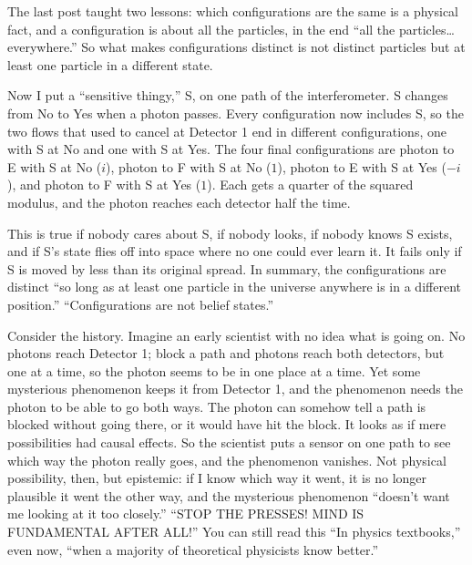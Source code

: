 
The last post taught two lessons: which configurations are the same is a physical fact, and a configuration is about all the particles, in the end ``all the particles… everywhere.'' So what makes configurations distinct is not distinct particles but at least one particle in a different state. 

Now I put a ``sensitive thingy,'' S, on one path of the interferometer. S changes from No to Yes when a photon passes. Every configuration now includes S, so the two flows that used to cancel at Detector 1 end in different configurations, one with S at No and one with S at Yes. The four final configurations are photon to E with S at No ($i$), photon to F with S at No ($1$), photon to E with S at Yes ($-i$), and photon to F with S at Yes ($1$). Each gets a quarter of the squared modulus, and the photon reaches each detector half the time. 

This is true if nobody cares about S, if nobody looks, if nobody knows S exists, and if S's state flies off into space where no one could ever learn it. It fails only if S is moved by less than its original spread.  In summary, the configurations are distinct ``so long as at least one particle in the universe anywhere is in a different position.''  ``Configurations are not belief states.'' 

Consider the history. Imagine an early scientist with no idea what is going on. No photons reach Detector 1; block a path and photons reach both detectors, but one at a time, so the photon seems to be in one place at a time. Yet some mysterious phenomenon keeps it from Detector 1, and the phenomenon needs the photon to be able to go both ways. The photon can somehow tell a path is blocked without going there, or it would have hit the block. It looks as if mere possibilities had causal effects. So the scientist puts a sensor on one path to see which way the photon really goes, and the phenomenon vanishes. Not physical possibility, then, but epistemic: if I know which way it went, it is no longer plausible it went the other way, and the mysterious phenomenon ``doesn't want me looking at it too closely.'' ``STOP THE PRESSES! MIND IS FUNDAMENTAL AFTER ALL!'' You can still read this ``In physics textbooks,'' even now, ``when a majority of theoretical physicists know better.'' 

